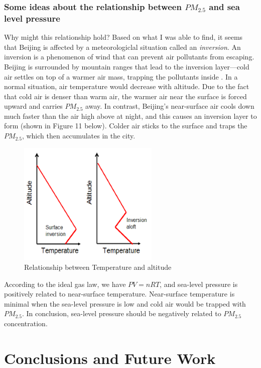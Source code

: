 \documentclass[11pt]{article} %
\begin{document}
\subsubsection{Some ideas about the relationship between \(PM_{2.5}\) and sea level pressure}

Why might this relationship hold? Based on what I was able to find, it seems that Beijing is affected by a meteorologiclal situation called an \textit{inversion}. An inversion is a phenomenon of wind that can prevent air pollutants from escaping. Beijing is surrounded by mountain ranges that lead to the inversion layer—cold air settles on top of a warmer air mass, trapping the pollutants inside \cite{Hawkins10}. In a normal situation, air temperature would decrease with altitude. Due to the fact that cold air is denser than warm air, the warmer air near the surface is forced upward and carries \(PM_{2.5}\) away. In contrast, Beijing’s near-surface air cools down much faster than the air high above at night, and this causes an inversion layer to form (shown in Figure 11 below). Colder air sticks to the surface and traps the \(PM_{2.5}\), which then accumulates in the city.


 \begin{figure}[!ht]
  \centering
    \includegraphics[width=0.6\textwidth]{Figure2-8}
      \caption{Relationship between Temperature and altitude\cite{Inversion}}
\end{figure}

According to the ideal gas law, we have \(PV=nRT\), and sea-level pressure is positively related to near-surface temperature.  
Near-surface temperature is minimal when the sea-level pressure is low and cold air would be trapped with \(PM_{2.5}\).
In conclusion, sea-level pressure should be negatively related to \(PM_{2.5}\) concentration.


\section{Conclusions and Future Work}
\end{document}

